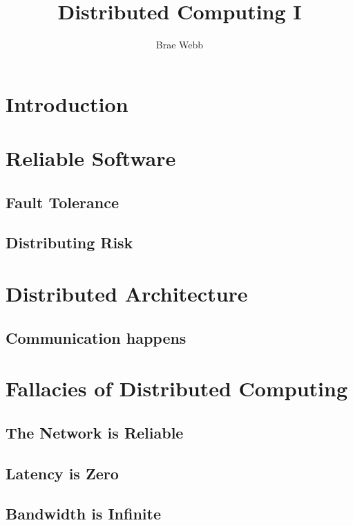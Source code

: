 \title{Distributed Computing I}
\author{Brae Webb}
\date{}

\maketitle

\section{Introduction}

\section{Reliable Software}

\subsection{Fault Tolerance}

\subsection{Distributing Risk}

\section{Distributed Architecture}

\subsection{Communication happens}

\section{Fallacies of Distributed Computing}
\subsection{The Network is Reliable}

\subsection{Latency is Zero}

\subsection{Bandwidth is Infinite}

